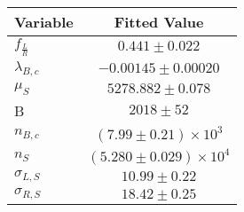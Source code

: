\begin{tabular}[t]{lc}
\hline
Variable &Fitted Value\\
\hline\hline
$f_{\frac{L}{R}}$&$0.441\pm0.022$\\
\hline
$\lambda_{B,c}$&$-0.00145\pm0.00020$\\
\hline
$\mu_S$&$5278.882\pm0.078$\\
\hline
B&$2018\pm52$\\
\hline
$n_{B,c}$&$(7.99\pm0.21)\times 10^3$\\
\hline
$n_S$&$(5.280\pm0.029)\times 10^4$\\
\hline
$\sigma_{L, S}$&$10.99\pm0.22$\\
\hline
$\sigma_{R, S}$&$18.42\pm0.25$\\
\hline
\end{tabular}